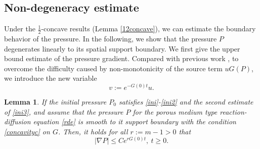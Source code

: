 \documentclass[10pt]{article}         %
\newtheorem{lemma}{Lemma}[section]
\numberwithin{equation}{section}
\begin{document}
\subsection{Non-degeneracy estimate}
Under the $\frac{1}{2}$-concave results (Lemma \ref{12concave}), we can estimate the boundary behavior of the pressure. In the following, we show that the pressure $P$ degenerates linearly to its spatial support boundary.   We first give the upper bound estimate of the pressure gradient. Compared with previous work \cite{DHL2001}, to overcome the difficulty caused by non-monotonicity of the source term $uG(P)$, we introduce the new variable \[ v:=e^{-G(0)t}u.\] 
\begin{lemma}\label{ue}
    If the initial pressure $P_0$ satisfies \eqref{ini}-\eqref{ini2} and the second estimate of \eqref{ini3}, and assume that the pressure $P$ for the porous medium type reaction-diffusion equation \eqref{rde}  is smooth to it support boundary with the condition \eqref{concavityc} on $G$. Then, it holds for all $r:=m-1>0$ that 
\[|\nabla P|\leq Ce^{rG(0)t},\ t\geq 0.\]
\end{lemma}
\end{document}
